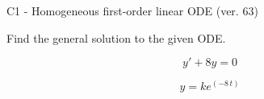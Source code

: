 \begin{exercise}
  \begin{exerciseTitle}C1 - Homogeneous first-order linear ODE (ver. 63)\end{exerciseTitle}
  \begin{exerciseStatement}
    
Find the general solution to the given ODE.

    
\[y'+8y=0\]

  \end{exerciseStatement}
  \begin{exerciseAnswer}
    
\[y= k e^{\left(-8 \, t\right)}\]

  \end{exerciseAnswer}
\end{exercise}